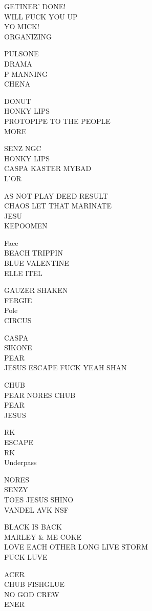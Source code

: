 \documentclass[10pt,letterpaper]{article}
\begin{document}
GETINER' DONE!\\
WILL FUCK YOU UP\\
YO MICK!\\
ORGANIZING

PULSONE\\
DRAMA\\
P MANNING\\
CHENA

DONUT\\
HONKY LIPS\\
PROTOPIPE TO THE PEOPLE\\
MORE

SENZ NGC\\
HONKY LIPS\\
CASPA KASTER MYBAD\\
L'OR

AS NOT PLAY DEED RESULT\\
CHAOS LET THAT MARINATE\\
JESU\\
KEPOOMEN

Face\\
BEACH TRIPPIN\\
BLUE VALENTINE\\
ELLE ITEL

GAUZER SHAKEN\\
FERGIE\\
Pole\\
CIRCUS

CASPA\\
SIKONE\\
PEAR\\
JESUS ESCAPE FUCK YEAH SHAN

CHUB\\
PEAR NORES CHUB\\
PEAR\\
JESUS

RK\\
ESCAPE\\
RK\\
Underpass

NORES\\
SENZY\\
TOES JESUS SHINO\\
VANDEL AVK NSF

BLACK IS BACK\\
MARLEY \& ME COKE\\
LOVE EACH OTHER LONG LIVE STORM\\
FUCK LUVE

ACER\\
CHUB FISHGLUE\\
NO GOD CREW\\
ENER
\end{document}
